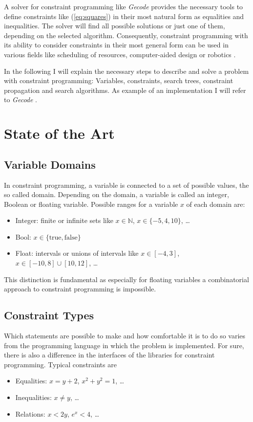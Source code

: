 \documentclass[10pt,
               a4paper,
               journal,
               ]{IEEEtran}
\newcommand{\refeq}[1]{{(\ref{#1})}}
\begin{document}
	A solver for constraint programming like \emph{Gecode} provides the necessary tools to define constraints like \refeq{eq:squares} in their most natural form as equalities and inequalities. The solver will find all possible solutions or just one of them, depending on the selected algorithm. Consequently, constraint programming with its ability to consider constraints in their most general form can be used in various fields like scheduling of resources, computer-aided design or robotics \cite[p.~221]{trendsInCP}.
	
	In the following I will explain the necessary steps to describe and solve a problem with constraint programming: Variables, constraints, search trees, constraint propagation and search algorithms. As example of an implementation I will refer to \emph{Gecode} \cite{gecode}.
	
	\section{State of the Art}
	\subsection{Variable Domains}
	In constraint programming, a variable is connected to a set of possible values, the so called domain. Depending on the domain, a variable is called an integer, Boolean or floating variable. Possible ranges for a variable $x$ of each domain are:
	\begin{itemize}
		\item Integer: finite or infinite sets like $x \in \mathbb{N}$, $x \in \{-5, 4, 10\}$, \dots
		\item Bool: $x \in \{\text{true}, \text{false}\}$
		\item Float: intervals or unions of intervals like $x \in [-4, 3]$, $x \in [-10, 8] \cup [10, 12]$, \dots
	\end{itemize}
	This distinction is fundamental as especially for floating variables a combinatorial approach to constraint programming is impossible.
	
	\subsection{Constraint Types}
	Which statements are possible to make and how comfortable it is to do so varies from the programming language in which the problem is implemented. For sure, there is also a difference in the interfaces of the libraries for constraint programming. Typical constraints are
	\begin{itemize}
		\item Equalities: $x = y + 2$, $x^2 + y^2 = 1$, \dots
		\item Inequalities: $x \ne y$, \dots
		\item Relations: $x < 2 y$, $e^x < 4$, \dots
	\end{itemize}
	
\end{document}
